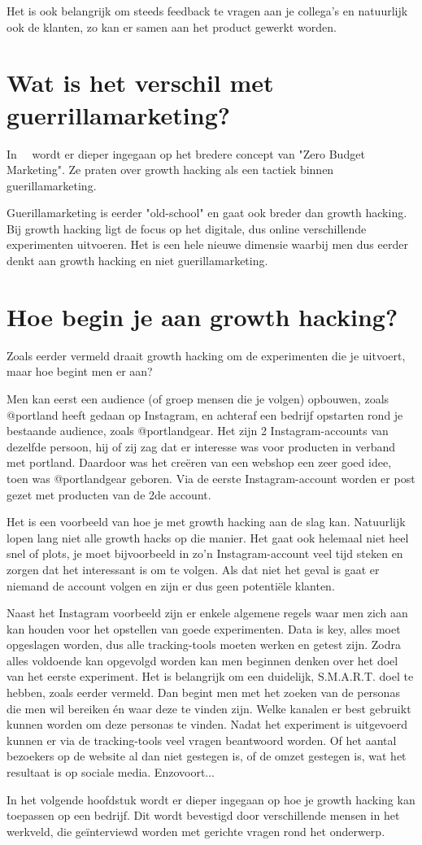 Het is ook belangrijk om steeds feedback te vragen aan je collega's en natuurlijk ook de klanten, zo kan er samen aan het product gewerkt worden.

\section{Wat is het verschil met guerrillamarketing?}
\label{sec:verschil-met-guerrillamarketing}

In~~\autocite{fizzle.co2015} wordt er dieper ingegaan op het bredere concept van "Zero Budget Marketing". Ze praten over growth hacking als een tactiek binnen guerillamarketing. 

Guerillamarketing is eerder "old-school" en gaat ook breder dan growth hacking. Bij growth hacking ligt de focus op het digitale, dus online verschillende experimenten uitvoeren. Het is een hele nieuwe dimensie waarbij men dus eerder denkt aan growth hacking en niet guerillamarketing.

\section{Hoe begin je aan growth hacking?}
\label{sec:hoe-growth-hacking}
 
Zoals eerder vermeld draait growth hacking om de experimenten die je uitvoert, maar hoe begint men er aan?

Men kan eerst een audience (of groep mensen die je volgen) opbouwen, zoals @portland heeft gedaan op Instagram, en achteraf een bedrijf opstarten rond je bestaande audience, zoals @portlandgear. Het zijn 2 Instagram-accounts van dezelfde persoon, hij of zij zag dat er interesse was voor producten in verband met portland. Daardoor was het creëren van een webshop een zeer goed idee, toen was @portlandgear geboren. Via de eerste Instagram-account worden er post gezet met producten van de 2de account.

Het is een voorbeeld van hoe je met growth hacking aan de slag kan. Natuurlijk lopen lang niet alle growth hacks op die manier. Het gaat ook helemaal niet heel snel of plots, je moet bijvoorbeeld in zo'n Instagram-account veel tijd steken en zorgen dat het interessant is om te volgen. Als dat niet het geval is gaat er niemand de account volgen en zijn er dus geen potentiële klanten.

Naast het Instagram voorbeeld zijn er enkele algemene regels waar men zich aan kan houden voor het opstellen van goede experimenten. Data is key, alles moet opgeslagen worden, dus alle tracking-tools moeten werken en getest zijn. Zodra alles voldoende kan opgevolgd worden kan men beginnen denken over het doel van het eerste experiment. Het is belangrijk om een duidelijk, S.M.A.R.T. doel te hebben, zoals eerder vermeld. Dan begint men met het zoeken van de personas die men wil bereiken én waar deze te vinden zijn. Welke kanalen er best gebruikt kunnen worden om deze personas te vinden. Nadat het experiment is uitgevoerd kunnen er via de tracking-tools veel vragen beantwoord worden. Of het aantal bezoekers op de website al dan niet gestegen is, of de omzet gestegen is, wat het resultaat is op sociale media. Enzovoort... 

In het volgende hoofdstuk wordt er dieper ingegaan op hoe je growth hacking kan toepassen op een bedrijf. Dit wordt bevestigd door verschillende mensen in het werkveld, die geïnterviewd worden met gerichte vragen rond het onderwerp.

